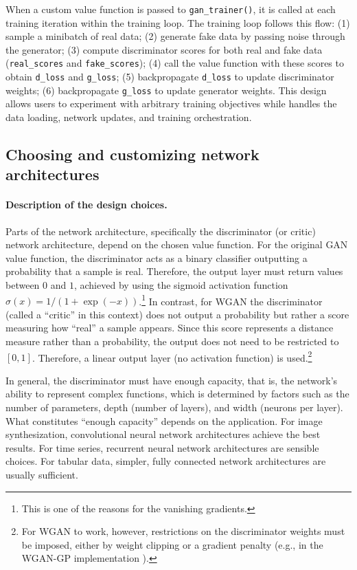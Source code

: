 When a custom value function is passed to \texttt{gan\_trainer()}, it is called at each training iteration within the training loop. The training loop follows this flow: (1) sample a minibatch of real data; (2) generate fake data by passing noise through the generator; (3) compute discriminator scores for both real and fake data (\texttt{real\_scores} and \texttt{fake\_scores}); (4) call the value function with these scores to obtain \texttt{d\_loss} and \texttt{g\_loss}; (5) backpropagate \texttt{d\_loss} to update discriminator weights; (6) backpropagate \texttt{g\_loss} to update generator weights. This design allows users to experiment with arbitrary training objectives while  handles the data loading, network updates, and training orchestration.

\subsection{Choosing and customizing network architectures}\label{sec:architecture}

\paragraph{Description of the design choices.}\label{description-of-the-design-choices.-1}

Parts of the network architecture, specifically the
discriminator (or critic) network architecture, depend on the chosen value function.
For the original GAN value function, the discriminator acts as a binary classifier outputting a probability that a sample is real. Therefore, the output layer must return values between \(0\) and \(1\), achieved by using the sigmoid activation function \(\sigma(x) = 1/(1+\exp(-x))\).\footnote{This is one of the reasons for the vanishing gradients.}
In contrast, for WGAN the discriminator (called a ``critic'' in this context) does not output a probability but rather a score measuring how ``real'' a sample appears. Since this score represents a distance measure rather than a probability, the output does not need to be restricted to \([0,1]\). Therefore, a linear output layer (no activation function) is used.\footnote{For WGAN to work, however, restrictions on the discriminator weights must be imposed, either by weight clipping or a
  gradient penalty (e.g., in the WGAN-GP implementation
  \citep{gulrajani2017}).}

In general, the discriminator must have enough capacity, that is, the network's ability to represent complex functions, which is determined by factors such as the number of parameters, depth (number of layers), and width (neurons per layer).
What constitutes ``enough capacity'' depends on the application.
For image synthesization, convolutional neural network architectures
achieve the best results. For time series, recurrent neural network
architectures are sensible choices. For tabular data, simpler, fully
connected network architectures are usually sufficient.

